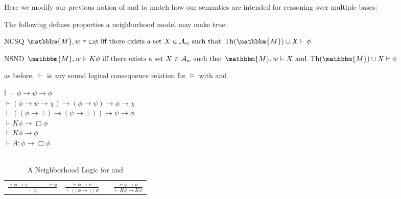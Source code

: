 Here we modify our previous notion of  and  to
match how our semantics are intended for reasoning over multiple bases:

\begin{definition}
  The following defines properties a neighborhood model may make true:
  
  \begin{descriptiondash}
    \item[NCSQ] $\mathbbm{M}, w \vDash \Box \phi \text{ iff there exists a set
    $X \in \mathcal{A}_w$ such that } \tmop{Th} (\mathbbm{M}) \cup X \vdash
    \phi$
    
    \item[NSND] $\mathbbm{M}, w \vDash K \phi \text{ iff there exists a set $X
    \in \mathcal{A}_w$ such that $\mathbbm{M}, w \vDash X$ and } \tmop{Th}
    (\mathbbm{M}) \cup X \vdash \phi$
  \end{descriptiondash}
  
  as before, $\vdash$ is any sound logical consequence relation for $\vDash$
  with  and 
\end{definition}

\begin{table}[h]
  \begin{tabular}{l}
    $\vdash \phi \rightarrow \psi \rightarrow \phi$\\
    $\vdash (\phi \rightarrow \psi \rightarrow \chi) \rightarrow (\phi
    \rightarrow \psi) \rightarrow \phi \rightarrow \chi$\\
    $\vdash ((\phi \rightarrow \bot) \rightarrow (\psi \rightarrow \bot))
    \rightarrow \psi \rightarrow \phi$\\
    $\vdash K \phi \rightarrow \Box \phi$\\
    $\vdash K \phi \rightarrow \phi$\\
    $\vdash A : \phi \rightarrow \Box \phi$\\
    \\
    \begin{tabular}{llll}
      $\frac{\vdash \phi \rightarrow \psi \hspace{4em} \vdash \phi}{\vdash
      \psi}$ & {\hspace{6em}}$\frac{\vdash \phi \rightarrow \psi}{\vdash \Box
      \phi \rightarrow \Box \psi}$ & {\hspace{6em}} & $\frac{\vdash \phi
      \rightarrow \psi}{\vdash K \phi \rightarrow K \psi}$
    \end{tabular}
  \end{tabular}
  \caption{\label{logic3}A Neighborhood Logic for  and
  {}}
\end{table}

